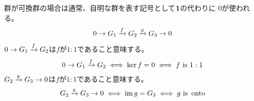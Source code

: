 	群が可換群の場合は通常、自明な群を表す記号として${\mathbf{1}}$の代わりに
	$0$が使われる。
	\begin{equation*}\begin{split} %
		0 \to G_1 \xto{f} G_2 \xto{g} G_3 \to 0
	\end{split}\end{equation*} %
	$0\to G_1\xrightarrow[{}]{f} G_2$は$f$が$1:1$であること意味する。
	\begin{equation*}\begin{split} %
		0\to G_1\xto{f} G_2 \iff \ker f = 0 \iff f \text{ is }1:1
	\end{split}\end{equation*} %
	$G_2 \xrightarrow[{}]{g} G_3 \to 0$は$f$が$1:1$であること意味する。
	\begin{equation*}\begin{split} %
		G_2 \xto{g} G_3 \to 0 \iff \im g = G_3 \iff g \text{ is }\onto
	\end{split}\end{equation*} %
\endgroup %
